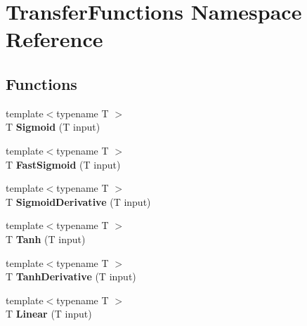 \hypertarget{namespace_transfer_functions}{\section{Transfer\-Functions Namespace Reference}
\label{namespace_transfer_functions}
}
\subsection*{Functions}
\begin{DoxyCompactItemize}
\item 
\hypertarget{namespace_transfer_functions_a9df6db0ada4f365903d3a75aeebab3a6}{{\footnotesize template$<$typename T $>$ }\\T {\bfseries Sigmoid} (T input)}\label{namespace_transfer_functions_a9df6db0ada4f365903d3a75aeebab3a6}

\item 
\hypertarget{namespace_transfer_functions_a4c4f8655694155260ee1a3f29399ed5c}{{\footnotesize template$<$typename T $>$ }\\T {\bfseries Fast\-Sigmoid} (T input)}\label{namespace_transfer_functions_a4c4f8655694155260ee1a3f29399ed5c}

\item 
\hypertarget{namespace_transfer_functions_ae35cac80814f86dca80c98745f038a40}{{\footnotesize template$<$typename T $>$ }\\T {\bfseries Sigmoid\-Derivative} (T input)}\label{namespace_transfer_functions_ae35cac80814f86dca80c98745f038a40}

\item 
\hypertarget{namespace_transfer_functions_a0ec3800c9549439c0ed45e9b0a0bff88}{{\footnotesize template$<$typename T $>$ }\\T {\bfseries Tanh} (T input)}\label{namespace_transfer_functions_a0ec3800c9549439c0ed45e9b0a0bff88}

\item 
\hypertarget{namespace_transfer_functions_ae8021fc6db8a440800c7d02b9a4dfa42}{{\footnotesize template$<$typename T $>$ }\\T {\bfseries Tanh\-Derivative} (T input)}\label{namespace_transfer_functions_ae8021fc6db8a440800c7d02b9a4dfa42}

\item 
\hypertarget{namespace_transfer_functions_a0d83aec6536e9695890ebe13fc6126d0}{{\footnotesize template$<$typename T $>$ }\\T {\bfseries Linear} (T input)}\label{namespace_transfer_functions_a0d83aec6536e9695890ebe13fc6126d0}


\end{DoxyCompactItemize}
